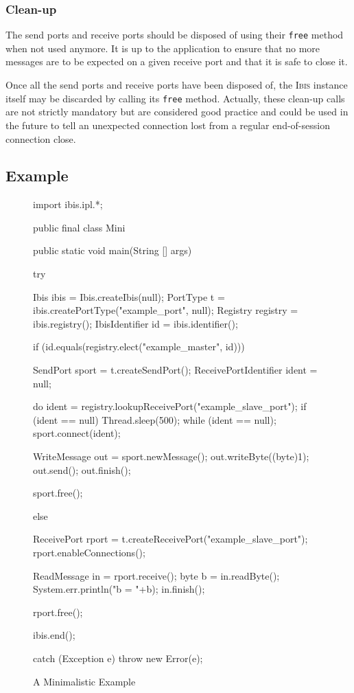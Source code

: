\documentclass[11pt]{book}
\def\Ibis{\textsc{Ibis}\xspace}
\begin{document}
%
\subsubsection{Clean-up}
\label{sec:clean-up-2}

The send ports and receive ports should be disposed of using their
\texttt{free} method when not used anymore. It is up to the
application to ensure that no more messages are to be expected on a
given receive port and that it is safe to close it.

Once all the send ports and receive ports have been disposed of, the
\Ibis instance itself may be discarded by calling its \texttt{free}
method. Actually, these clean-up calls are not strictly mandatory but
are considered good practice and could be used in the future to tell
an unexpected connection lost from a regular end-of-session connection
close.


\subsection{Example}
\label{sec:example}

\begin{figure}[htbp]
  \centering
\begin{Miniverb}
import ibis.ipl.*;

public final class Mini {
  public static void main(String [] args) {
    try {
      Ibis ibis         = Ibis.createIbis(null);
      PortType t        = ibis.createPortType("example_port", null);
      Registry registry = ibis.registry();
      IbisIdentifier id = ibis.identifier();

      if (id.equals(registry.elect("example_master", id))) {
        SendPort sport = t.createSendPort();
        ReceivePortIdentifier ident = null;

        do {
          ident = registry.lookupReceivePort("example_slave_port");
          if (ident == null) {
            Thread.sleep(500);
          }
        } while (ident == null);
        sport.connect(ident);

        WriteMessage out = sport.newMessage();
        out.writeByte((byte)1);
        out.send();
        out.finish();

        sport.free();
      } else {
        ReceivePort rport = t.createReceivePort("example_slave_port");
        rport.enableConnections();

        ReadMessage in = rport.receive();
        byte b = in.readByte();
        System.err.println("b = "+b);
        in.finish();

        rport.free();
      }

      ibis.end();
    } catch (Exception e) {
      throw new Error(e);
    }
  }
}
\end{Miniverb}

  \caption{A Minimalistic Example}
  \label{fig:mini-example}
\end{figure}
\end{document}
